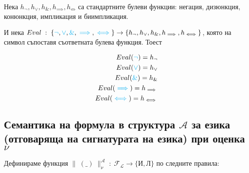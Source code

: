 \documentclass{article}[12pt]
\newcommand{\Lang}{\mathcal{L}}
\begin{document}
Нека \(h_{\neg}, h_{\lor}, h_{\&}, h_{\implies}, h_{\iff}\) са стандартните булеви функции: негация, дизюнкция, конюнкция, импликация и биимпликация.

И нека \(Eval \; : \; \{\color{cyan}\lnot \color{black}, \color{cyan} \lor \color{black} , \color{cyan} \& \color{black} , \color{cyan}\implies \color{black} , \color{cyan}\iff \color{black} \} \to \{h_{\neg}, h_{\lor}, h_{\&}, h_{\implies}, h_{\iff}\} \),
която на символ съпоставя съответната булева функция. Тоест

\begin{align*}
Eval(\color{cyan} \neg \color{black}) = h_{\neg} \\
Eval(\color{cyan} \lor \color{black}) = h_{\lor} \\
Eval(\color{cyan} \& \color{black}) = h_{\&} \\
Eval(\color{cyan} \implies \color{black}) = h_{\implies} \\
Eval(\color{cyan} \iff \color{black}) = h_{\iff}
\end{align*}

\subsection{Семантика на формула в структура \(\mathcal{A}\) за езика (отговаряща на сигнатурата на езика) при оценка \(\nu\)}

Дефинираме функция \( \| \; (\_) \; \|^{\mathcal{A}}_{\nu} \; : \; \mathcal{F}_\Lang \to \{\text{И}, \text{Л}\} \) по следните правила:
\end{document}

